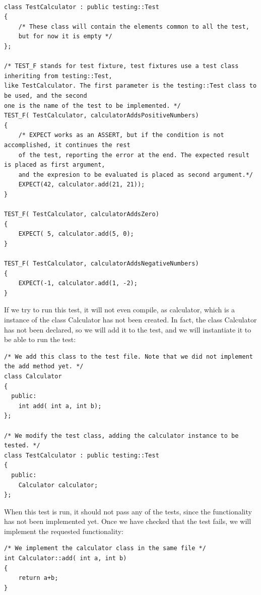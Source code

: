 \Cpp
\begin{lstlisting}

class TestCalculator : public testing::Test
{
	/* These class will contain the elements common to all the test, 
	but for now it is empty */
};

/* TEST_F stands for test fixture, test fixtures use a test class inheriting from testing::Test,
like TestCalculator. The first parameter is the testing::Test class to be used, and the second
one is the name of the test to be implemented. */ 
TEST_F( TestCalculator, calculatorAddsPositiveNumbers)
{
	/* EXPECT works as an ASSERT, but if the condition is not accomplished, it continues the rest
	of the test, reporting the error at the end. The expected result is placed as first argument, 
	and the expresion to be evaluated is placed as second argument.*/
	EXPECT(42, calculator.add(21, 21));
}

TEST_F( TestCalculator, calculatorAddsZero)
{
	EXPECT( 5, calculator.add(5, 0);
}

TEST_F( TestCalculator, calculatorAddsNegativeNumbers)
{
	EXPECT(-1, calculator.add(1, -2);
}
\end{lstlisting}

If we try to run this test, it will not even compile, as calculator, which is a instance of the class Calculator has not been created. In fact, the class Calculator has not been declared, so we will add it to the test, and we will instantiate it to be able to run the test:\\

\Cpp
\begin{lstlisting}
/* We add this class to the test file. Note that we did not implement the add method yet. */
class Calculator 
{
  public:
    int add( int a, int b);
};

/* We modify the test class, adding the calculator instance to be tested. */
class TestCalculator : public testing::Test
{
  public:
    Calculator calculator;
};

\end{lstlisting}

When this test is run, it should not pass any of the tests, since the functionality has not been implemented yet. Once we have checked that the test fails, we will implement the requested functionality:\\

\Cpp
\begin{lstlisting}
/* We implement the calculator class in the same file */
int Calculator::add( int a, int b)
{
    return a+b;
}
\end{lstlisting}

